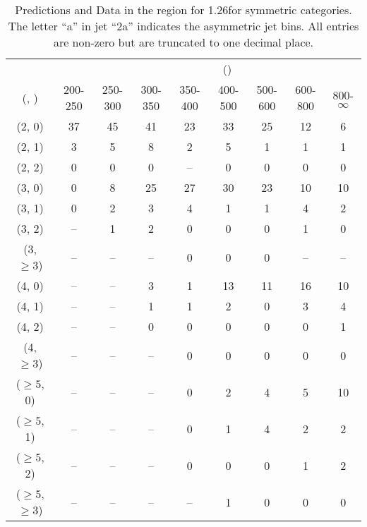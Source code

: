 \begin{table}[h!]
\tiny
\centering
\caption{Predictions and Data in the \mmj region for 1.26\ifb for symmetric categories. The letter ``a'' in jet \eg ``2a''  indicates the asymmetric jet bins. All entries are non-zero but are truncated to one decimal place.\label{tab:yieldsseppost_mumu_data_sym}}
\begin{tabular}
{ccccccccc}
	\hline\hline
&	& \multicolumn{8}{c}{\scalht (\gev)} \\ 
	 (\njet,  \nb) & 200-250 & 250-300 & 300-350 & 350-400 & 400-500 & 500-600 & 600-800 & 800-$\infty$ \\ [0.8ex] 
\hline
	(2, 0) & 37 & 45 & 41 & 23 & 33 & 25 & 12 & 6 \\[0.5ex] 
	(2, 1) & 3 & 5 & 8 & 2 & 5 & 1 & 1 & 1 \\[0.5ex] 
	(2, 2) & 0 & 0 & 0 & -- & 0 & 0 & 0 & 0 \\[0.5ex] 
	(3, 0) & 0 & 8 & 25 & 27 & 30 & 23 & 10 & 10 \\[0.5ex] 
	(3, 1) & 0 & 2 & 3 & 4 & 1 & 1 & 4 & 2 \\[0.5ex] 
	(3, 2) & -- & 1 & 2 & 0 & 0 & 0 & 1 & 0 \\[0.5ex] 
	(3, $\ge3$) & -- & -- & -- & 0 & 0 & 0 & -- & -- \\[0.5ex] 
	(4, 0) & -- & -- & 3 & 1 & 13 & 11 & 16 & 10 \\[0.5ex] 
	(4, 1) & -- & -- & 1 & 1 & 2 & 0 & 3 & 4 \\[0.5ex] 
	(4, 2) & -- & -- & 0 & 0 & 0 & 0 & 0 & 1 \\[0.5ex] 
	(4, $\ge3$) & -- & -- & -- & 0 & 0 & 0 & 0 & 0 \\[0.5ex] 
	($\ge5$, 0) & -- & -- & -- & 0 & 2 & 4 & 5 & 10 \\[0.5ex] 
	($\ge5$, 1) & -- & -- & -- & 0 & 1 & 4 & 2 & 2 \\[0.5ex] 
	($\ge5$, 2) & -- & -- & -- & 0 & 0 & 0 & 1 & 2 \\[0.5ex] 
	($\ge5$, $\ge3$) & -- & -- & -- & -- & 1 & 0 & 0 & 0 \\[0.5ex] 
	\hline
	\hline
\end{tabular}
\end{table}
